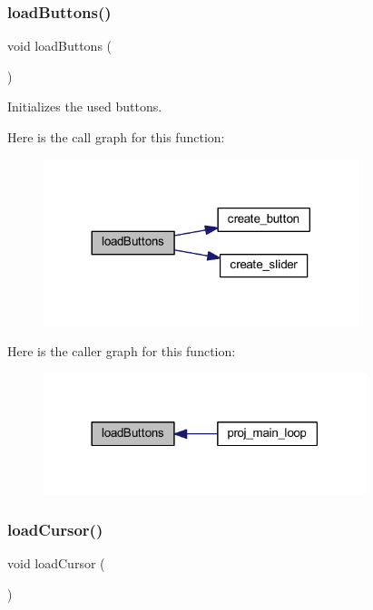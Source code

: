 \subsubsection{\texorpdfstring{load\+Buttons()}{loadButtons()}}
{\footnotesize\ttfamily void load\+Buttons (\begin{DoxyParamCaption}{ }\end{DoxyParamCaption})}



Initializes the used buttons. 

Here is the call graph for this function\+:\nopagebreak
\begin{figure}[H]
\begin{center}
\leavevmode
\includegraphics[width=260pt]{group__pengoo_ga95635b27f6c1165153d2c11de57e60a8_cgraph}
\end{center}
\end{figure}
Here is the caller graph for this function\+:\nopagebreak
\begin{figure}[H]
\begin{center}
\leavevmode
\includegraphics[width=266pt]{group__pengoo_ga95635b27f6c1165153d2c11de57e60a8_icgraph}
\end{center}
\end{figure}
\mbox{\label{group__pengoo_ga099795341d84ce8caa2e79aeccfff34f}} 
\subsubsection{\texorpdfstring{load\+Cursor()}{loadCursor()}}
{\footnotesize\ttfamily void load\+Cursor (\begin{DoxyParamCaption}{ }\end{DoxyParamCaption})}



